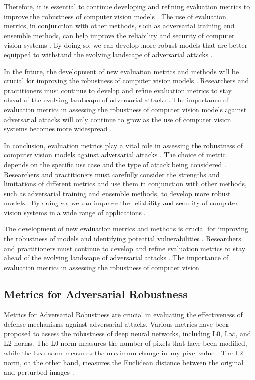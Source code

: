 \documentclass[11pt]{article}
\begin{document}
Therefore, it is essential to continue developing and refining evaluation metrics to improve the robustness of computer vision models \cite{ref165}. The use of evaluation metrics, in conjunction with other methods, such as adversarial training and ensemble methods, can help improve the reliability and security of computer vision systems \cite{ref21}. By doing so, we can develop more robust models that are better equipped to withstand the evolving landscape of adversarial attacks \cite{ref166}.

In the future, the development of new evaluation metrics and methods will be crucial for improving the robustness of computer vision models \cite{ref90}. Researchers and practitioners must continue to develop and refine evaluation metrics to stay ahead of the evolving landscape of adversarial attacks \cite{ref20}. The importance of evaluation metrics in assessing the robustness of computer vision models against adversarial attacks will only continue to grow as the use of computer vision systems becomes more widespread \cite{ref106}.

In conclusion, evaluation metrics play a vital role in assessing the robustness of computer vision models against adversarial attacks \cite{ref148}. The choice of metric depends on the specific use case and the type of attack being considered \cite{ref6}. Researchers and practitioners must carefully consider the strengths and limitations of different metrics and use them in conjunction with other methods, such as adversarial training and ensemble methods, to develop more robust models \cite{ref149}. By doing so, we can improve the reliability and security of computer vision systems in a wide range of applications \cite{ref150}.

The development of new evaluation metrics and methods is crucial for improving the robustness of models and identifying potential vulnerabilities \cite{ref167}. Researchers and practitioners must continue to develop and refine evaluation metrics to stay ahead of the evolving landscape of adversarial attacks \cite{ref168}. The importance of evaluation metrics in assessing the robustness of computer vision

\subsection{Metrics for Adversarial Robustness}

Metrics for Adversarial Robustness are crucial in evaluating the effectiveness of defense mechanisms against adversarial attacks. Various metrics have been proposed to assess the robustness of deep neural networks, including L0, L\(\infty\), and L2 norms. The L0 norm measures the number of pixels that have been modified, while the L\(\infty\) norm measures the maximum change in any pixel value \cite{ref142}. The L2 norm, on the other hand, measures the Euclidean distance between the original and perturbed images \cite{ref172}.
\end{document}
